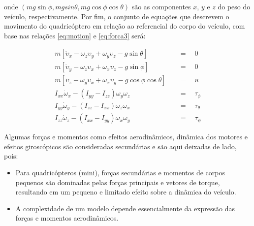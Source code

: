 \documentclass[a4paper, 12pt]{article}
\begin{document}
\noindent onde $(mg\sin{\phi},mgsin{\theta},mg\cos{\phi}\cos{\theta})$ são as componentes $x$, $y$ e $z$ do peso do veículo, respectivamente. Por fim, o conjunto de equações que descrevem o movimento do quadricóptero em relação ao referencial do corpo do veículo, com base nas relações \ref{eq:motion} e \ref{eq:forca3} será:

\begin{equation}
\begin{aligned}
	m\left[ { \dot { \upsilon  }  }_{ x } - { \omega  }_{ z }\upsilon_{ y } + { \omega  }_{ y }{ \upsilon  }_{ z } - g\sin{\theta} \right] \quad &=\quad 0 \\ 
	m\left[ { \dot { \upsilon  }  }_{ y } - { \omega  }_{ z }\upsilon_{ x } + { \omega  }_{ x }{ \upsilon  }_{ z } - g\sin{\phi} \right] \quad &=\quad 0 \\
	m\left[ { \dot { \upsilon  }  }_{ z } - { \omega  }_{ y }\upsilon_{ x } + { \omega  }_{ x }{ \upsilon  }_{ y } - g\cos{\phi}\cos{\theta} \right] \quad &=\quad u \\ 
	{ I }_{ xx }{ \dot { \omega  }  }_{ x } - (I_{ yy } - I_{ zz }){ \omega  }_{ y }{ \omega  }_{ z }\quad &=\quad \tau_{\phi} \\
	{ I }_{ yy }{ \dot { \omega  }  }_{ y } - (I_{ zz } - I_{ xx }){ \omega  }_{ z }{ \omega  }_{ x }\quad &=\quad \tau_{\theta}\\
	{ I }_{ zz }{ \dot { \omega  }  }_{ z } - (I_{ xx } - I_{ yy }){ \omega  }_{ x }{ \omega  }_{ y }\quad &=\quad \tau_{\psi} 
\end{aligned}
\label{eq:forca4}
\end{equation}

Algumas forças e momentos como efeitos aerodinâmicos, dinâmica dos motores e efeitos giroscópicos são consideradas secundárias e são aqui deixadas de lado, pois:

\begin{itemize}
\item	Para quadricópteros (mini), forças secundárias e momentos de corpos pequenos são dominadas pelas forças principais e vetores de torque, resultando em um pequeno e limitado efeito sobre a dinâmica do veículo.
\item A complexidade de um modelo depende essencialmente da expressão das forças e momentos aerodinâmicos.
\end{itemize}



\newpage


 

\newpage
\end{document}
